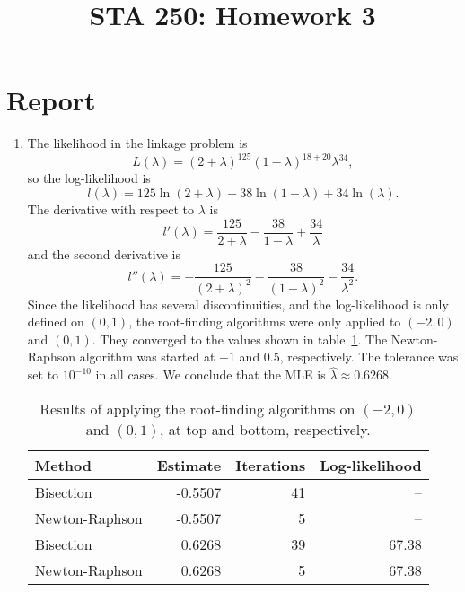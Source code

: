 

\pagestyle{name}
\title{STA 250: Homework 3}


\chapter*{Report}
\begin{enumerate}
\item %
The likelihood in the linkage problem is
    \[
    L(\lambda) = (2 + \lambda)^{125} (1 - \lambda)^{18+20} \lambda^{34},
    \]
so the log-likelihood is
    \[
    l(\lambda) = 125\ln(2 + \lambda) + 38\ln(1 - \lambda) + 34\ln(\lambda).
    \]
The derivative with respect to $\lambda$ is
    \[
    l'(\lambda) = \frac{125}{2 + \lambda} - \frac{38}{1 - \lambda}
    + \frac{34}{\lambda}
    \]
and the second derivative is
    \[
    l''(\lambda) 
    =
    -\frac{125}{(2 + \lambda)^2} - \frac{38}{(1 - \lambda)^2}
    -\frac{34}{\lambda^2}.
    \]
Since the likelihood has several discontinuities,
and the log-likelihood is only defined on $(0, 1)$,
the root-finding algorithms were only applied to $(-2, 0)$ and $(0, 1)$.
They converged to the values shown in table~\ref{tab:roots}.
The Newton-Raphson algorithm was started at $-1$ and $0.5$, respectively.
The tolerance was set to $10^{-10}$ in all cases.
We conclude that the MLE is $\hat{\lambda} \approx 0.6268$.
    \begin{table}[h]
    \begin{tabular}{lrrr}
    \toprule
    Method & Estimate & Iterations & Log-likelihood \\
    \midrule
    Bisection & -0.5507 & 41 & -- \\
    Newton-Raphson & -0.5507 & 5 & -- \\
    \midrule
    Bisection & 0.6268 & 39 & 67.38 \\
    Newton-Raphson & 0.6268 & 5 & 67.38 \\
    \bottomrule
    \end{tabular}
    \caption{
    Results of applying the root-finding algorithms on $(-2, 0)$ and $(0, 1)$,
    at top and bottom, respectively.
    }
    \label{tab:roots}
    \end{table}


\end{enumerate}
